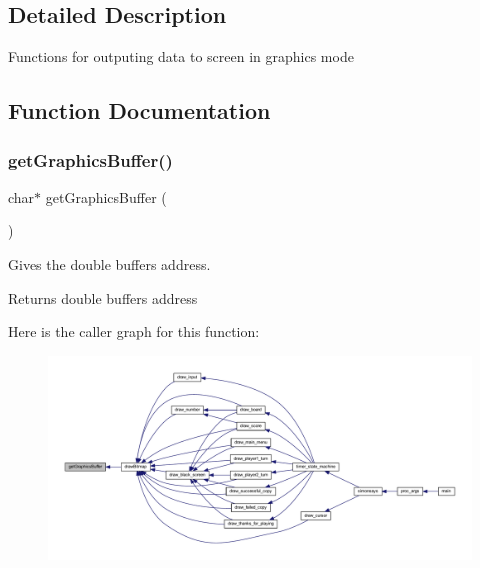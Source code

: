 \subsection{Detailed Description}
Functions for outputing data to screen in graphics mode 

\subsection{Function Documentation}
\mbox{\label{group__video__gr_ga0823d182cf2b320e5f344bdc420a02d0}} 
\subsubsection{\texorpdfstring{get\+Graphics\+Buffer()}{getGraphicsBuffer()}}
{\footnotesize\ttfamily char$\ast$ get\+Graphics\+Buffer (\begin{DoxyParamCaption}{ }\end{DoxyParamCaption})}



Gives the double buffer\textquotesingle{}s address. 

\begin{DoxyReturn}{Returns}
double buffer\textquotesingle{}s address 
\end{DoxyReturn}
Here is the caller graph for this function\+:\nopagebreak
\begin{figure}[H]
\begin{center}
\leavevmode
\includegraphics[width=350pt]{group__video__gr_ga0823d182cf2b320e5f344bdc420a02d0_icgraph}
\end{center}
\end{figure}
\mbox{\label{group__video__gr_gae2b9b38f4f97e1c580123c8e9a993353}} 
